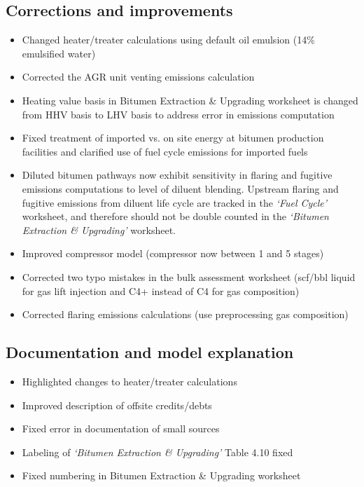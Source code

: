 \documentclass[11pt]{report}
\newcommand{\sheet}[1]{\textit{`{#1}'}}
\begin{document}
{{{{\subsection{Corrections and improvements}
\begin{itemize}
\item{Changed heater/treater calculations using default oil emulsion (14\% emulsified water)}
\item{Corrected the AGR unit venting emissions calculation}
\item{Heating value basis in Bitumen Extraction \& Upgrading worksheet is changed from HHV basis to LHV basis to address error in emissions computation}
\item{Fixed treatment of imported vs. on site energy at bitumen production facilities and clarified use of fuel cycle emissions for imported fuels}
\item{Diluted bitumen pathways now exhibit sensitivity in flaring and fugitive emissions computations to level of diluent blending. Upstream flaring and fugitive emissions from diluent life cycle are tracked in the \sheet{Fuel Cycle} worksheet, and therefore should not be double counted in the \sheet{Bitumen Extraction \& Upgrading} worksheet.}
\item{Improved compressor model (compressor now between 1 and 5 stages)}
\item{Corrected two typo mistakes in the bulk assessment worksheet (scf/bbl liquid for gas lift injection and C4+ instead of C4 for gas composition)}
\item{Corrected flaring emissions calculations (use preprocessing gas composition)}

\end{itemize}


\subsection{Documentation and model explanation}
\begin{itemize}
\item{Highlighted changes to heater/treater calculations}
\item{Improved description of offsite credits/debts}
\item{Fixed error in documentation of small sources}
\item{Labeling of \sheet{Bitumen Extraction \& Upgrading} Table 4.10 fixed}
\item{Fixed numbering in Bitumen Extraction \& Upgrading worksheet}
\end{itemize}








}}}}
\end{document}
